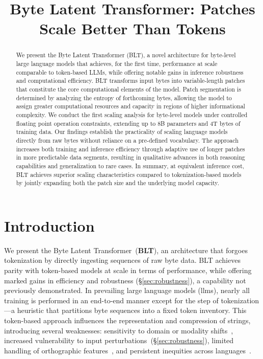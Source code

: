 \title{Byte Latent Transformer: Patches Scale Better Than Tokens}

\begin{abstract}
We present the Byte Latent Transformer ({\textsc BLT}), a novel architecture for byte-level large language models that achieves, for the first time, performance at scale comparable to token-based LLMs, while offering notable gains in inference robustness and computational efficiency. {\textsc BLT} transforms input bytes into variable-length patches that constitute the core computational elements of the model. Patch segmentation is determined by analyzing the entropy of forthcoming bytes, allowing the model to assign greater computational resources and capacity in regions of higher informational complexity. We conduct the first scaling analysis for byte-level models under controlled floating point operation constraints, extending up to 8B parameters and 4T bytes of training data. Our findings establish the practicality of scaling language models directly from raw bytes without reliance on a pre-defined vocabulary. The approach increases both training and inference efficiency through adaptive use of longer patches in more predictable data segments, resulting in qualitative advances in both reasoning capabilities and generalization to rare cases. In summary, at equivalent inference cost, {\textsc BLT} achieves superior scaling characteristics compared to tokenization-based models by jointly expanding both the patch size and the underlying model capacity.
\end{abstract}

\section{Introduction}
\label{section:intro}

We present the Byte Latent Transformer~(\textbf{BLT}), an architecture that forgoes tokenization by directly ingesting sequences of raw byte data. BLT achieves parity with token-based models at scale in terms of performance, while offering marked gains in efficiency and robustness (\S\ref{sec:robustness}), a capability not previously demonstrated. In prevailing large language models (llms), nearly all training is performed in an end-to-end manner except for the step of tokenization—a heuristic that partitions byte sequences into a fixed token inventory. This token-based approach influences the representation and compression of strings, introducing several weaknesses: sensitivity to domain or modality shifts~\citep{dagangetting}, increased vulnerability to input perturbations~(\S\ref{sec:robustness}), limited handling of orthographic features~\citep{edman2024cute}, and persistent inequities across languages~\citep{liang2023xlm,petrov2024language,limisiewicz2024myte}.

